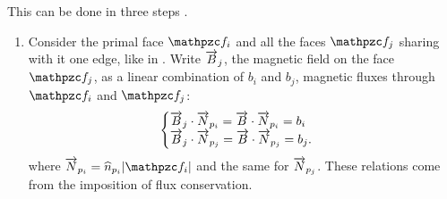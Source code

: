This can be done in three steps \cite{taflove_advances}.
\begin{enumerate}
\item
  Consider the primal face $\Surface{f}_i$ and all the faces
  $\Surface{f}_j$ sharing with it one edge, like in
  . Write $\overrightarrow{B}_j$, the magnetic field on the face
  $\Surface{f}_j$, as a linear combination of $b_i$ and $b_j$,
  magnetic fluxes through $\Surface{f}_i$ and $\Surface{f}_j$:
  \begin{equation*} \label{eqn:poincare_first_step} \begin{cases}
      {\overrightarrow{B}_j \cdot \overrightarrow{N}_{p_i}} =
      {\overrightarrow{B} \cdot \overrightarrow{N}_{p_i}} = b_i \\
      {\overrightarrow{B}_j \cdot \overrightarrow{N}_{p_j}} =
      {\overrightarrow{B} \cdot \overrightarrow{N}_{p_j}} = b_j .
  \end{cases} \end{equation*}
  where $\Vector{N}_{p_i} = \Versor{n}_{p_i} \Measure{\Surface{f}_i}$
  and the same for $\overrightarrow{N}_{p_j}$. These relations come from the
  imposition of flux conservation.
  

\end{enumerate}
